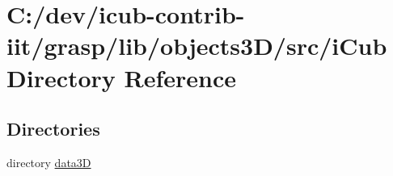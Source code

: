 \section{C\+:/dev/icub-\/contrib-\/iit/grasp/lib/objects3\+D/src/i\+Cub Directory Reference}
\label{dir_b70178e7b6945b6936fc27f331a21ed1}
\subsection*{Directories}
\begin{DoxyCompactItemize}
\item 
directory \hyperlink{dir_ced8d42f22d85e7d12f8e45af6539178}{data3\+D}
\end{DoxyCompactItemize}
